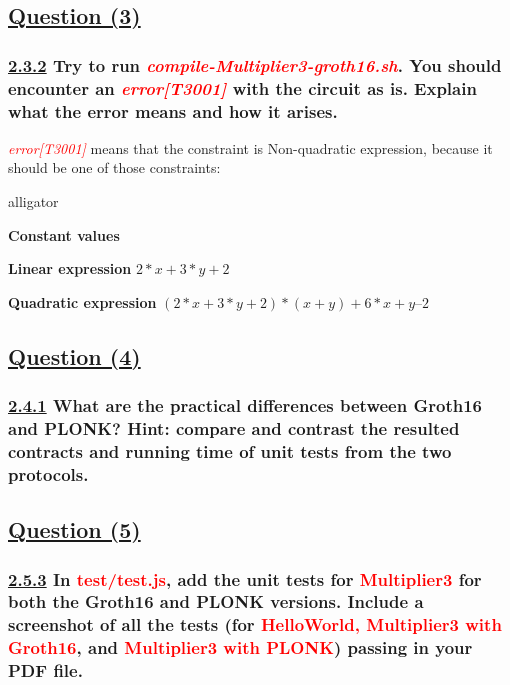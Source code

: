 \documentclass[letterpaper, 10 pt, conference]{ieeeconf}  %
\begin{document}
\subsection{\textbf{\underline{Question (3)}}}

\subsubsection{\textbf{\underline{2.3.2} Try to run \textcolor{red}{\textit{compile-Multiplier3-groth16.sh}}. You should encounter an \textcolor{red}{\textit{error[T3001]}} with the circuit as is. Explain what the error means and how it arises.}}

\textcolor{red}{\textit{error[T3001]}} means that the constraint is Non-quadratic expression, because it should be one of those constraints: 

\begin{labeling}{alligator}
\item [\textbf{Constant values}] 
\item [\textbf{Linear expression}]    $2*x + 3*y + 2$
\item [\textbf{Quadratic expression}] $(2*x + 3*y + 2) * (x+y) + 6*x + y – 2$
\end{labeling}  

\subsection{\textbf{\underline{Question (4)}}}
\subsubsection{\textbf{\underline{2.4.1} What are the practical differences between Groth16 and PLONK? Hint: compare and contrast the resulted contracts and running time of unit tests from the two protocols. }}

\subsection{\textbf{\underline{Question (5)}}}
\subsubsection{\textbf{\underline{2.5.3} In \textcolor{red}{test/test.js}, add the unit tests for \textcolor{red}{Multiplier3} for both the Groth16 and PLONK versions. Include a screenshot of all the tests (for \textcolor{red}{HelloWorld, Multiplier3 with Groth16}, and \textcolor{red}{Multiplier3 with PLONK}) passing in your PDF file.}}
\end{document}
